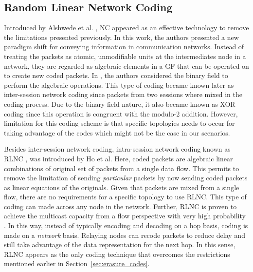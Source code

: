 \subsection{Random Linear Network Coding}
\label{sec:nc_rlnc}
Introduced by Alshwede et al. \cite{ahlswede2000network}, \ac{NC} appeared as an effective technology to remove the limitations presented previously. In this work, the authors presented a new paradigm shift for conveying information in communication networks. Instead of treating the packets as atomic, unmodifiable units at the intermediates node in a network, they are regarded as algebraic elements in a \ac{GF} that can be operated on to create new coded packets. In \cite{ahlswede2000network}, the authors considered the binary field to perform the algebraic operations. This type of coding became known later as inter-session network coding since packets from two sessions where mixed in the coding process. Due to the binary field nature, it also became known as XOR coding since this operation is congruent with the modulo-2 addition. However, limitation for this coding scheme is that specific topologies needs to occur for taking advantage of the codes which might not be the case in our scenarios.

Besides inter-session network coding, intra-session network coding known as \ac{RLNC} \cite{ho2006random}, was introduced by Ho et al. Here, coded packets are algebraic linear combinations of original set of packets from a single data flow. This permits to remove the limitation of sending \textit{particular} packets by now sending coded packets as linear equations of the originals. Given that packets are mixed from a single flow, there are no requirements for a specific topology to use \ac{RLNC}. This type of coding can made across any node in the network. Further, \ac{RLNC} is proven to achieve the multicast capacity from a flow perspective with very high probability \cite{koetter2003algebraic,ho2006random}. In this way, instead of typically encoding and decoding on a hop basis, coding is made on a \textit{network} basis. Relaying nodes can recode packets to reduce delay and still take advantage of the data representation for the next hop. In this sense, \ac{RLNC} appears as the only coding technique that overcomes the restrictions mentioned earlier in Section~\ref{sec:erasure_codes}.

